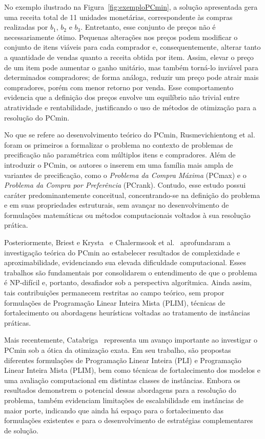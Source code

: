 No exemplo ilustrado na Figura~\ref{fig:exemploPCmin}, a solução apresentada gera uma receita total de 11 unidades monetárias, correspondente às compras realizadas por $b_1$, $b_2$ e $b_3$. Entretanto, esse conjunto de preços não é necessariamente ótimo. Pequenas alterações nos preços podem modificar o conjunto de itens viáveis para cada comprador e, consequentemente, alterar tanto a quantidade de vendas quanto a receita obtida por item. Assim, elevar o preço de um item pode aumentar o ganho unitário, mas também torná-lo inviável para determinados compradores; de forma análoga, reduzir um preço pode atrair mais compradores, porém com menor retorno por venda. Esse comportamento evidencia que a definição dos preços envolve um equilíbrio não trivial entre atratividade e rentabilidade, justificando o uso de métodos de otimização para a resolução do PCmin.

No que se refere ao desenvolvimento teórico do PCmin, Rusmevichientong et al.~\cite{rusmevichientong2006} foram os primeiros a formalizar o problema no contexto de problemas de precificação não paramétrica com múltiplos itens e compradores. Além de introduzir o PCmin, os autores o inserem em uma família mais ampla de variantes de precificação, como o \textit{Problema da Compra Máxima} (PCmax) e o \textit{Problema da Compra por Preferência} (PCrank). Contudo, esse estudo possui caráter predominantemente conceitual, concentrando-se na definição do problema e em suas propriedades estruturais, sem avançar no desenvolvimento de formulações matemáticas ou métodos computacionais voltados à sua resolução prática.

Posteriormente, Briest e Krysta~\cite{briest2007} e Chalermsook et al.~\cite{chalermsook2012} aprofundaram a investigação teórica do PCmin ao estabelecer resultados de complexidade e aproximabilidade, evidenciando sua elevada dificuldade computacional. Esses trabalhos são fundamentais por consolidarem o entendimento de que o problema é NP-difícil e, portanto, desafiador sob a perspectiva algorítmica. Ainda assim, tais contribuições permanecem restritas ao campo teórico, sem propor formulações de Programação Linear Inteira Mista (PLIM), técnicas de fortalecimento ou abordagens heurísticas voltadas ao tratamento de instâncias práticas.

Mais recentemente, Catabriga~\cite{catabriga2025} representa um avanço importante ao investigar o PCmin sob a ótica da otimização exata. Em seu trabalho, são propostas diferentes formulações de Programação Linear Inteira (PLI) e Programação Linear Inteira Mista (PLIM), bem como técnicas de fortalecimento dos modelos e uma avaliação computacional em distintas classes de instâncias. Embora os resultados demonstrem o potencial dessas abordagens para a resolução do problema, também evidenciam limitações de escalabilidade em instâncias de maior porte, indicando que ainda há espaço para o fortalecimento das formulações existentes e para o desenvolvimento de estratégias complementares de solução.


